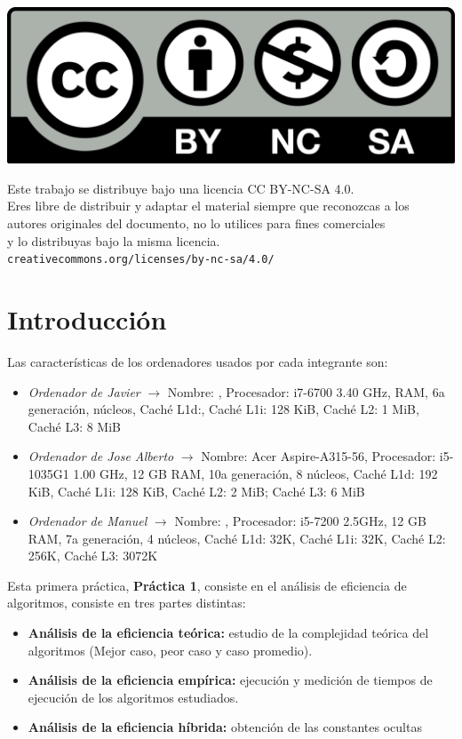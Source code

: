 \documentclass[10pt,a4paper]{article}
\begin{document}
\parbox[t]{\textwidth}{
  \includegraphics[scale=0.05]{by-nc-sa.png}\\[4pt]
  \raggedright %
  \sffamily\large
  {\Large Este trabajo se distribuye bajo una licencia CC BY-NC-SA 4.0.}\\[4pt]
  Eres libre de distribuir y adaptar el material siempre que reconozcas a los\\
  autores originales del documento, no lo utilices para fines comerciales\\
  y lo distribuyas bajo la misma licencia.\\[4pt]
  \texttt{creativecommons.org/licenses/by-nc-sa/4.0/}
}

\newpage

\tableofcontents

\newpage
\section{Introducción}

Las características de los ordenadores usados por cada integrante son:
\begin{itemize}
	\item \textit{Ordenador de Javier} \(\longrightarrow\) Nombre: , Procesador: i7-6700 3.40 GHz, RAM, 6a generación, núcleos, Caché L1d:, Caché L1i: 128 KiB, Caché L2: 1 MiB, Caché L3: 8 MiB 
	\item \textit{Ordenador de Jose Alberto} \(\longrightarrow\) Nombre: Acer Aspire-A315-56, Procesador: i5-1035G1 1.00 GHz, 12 GB RAM, 10a generación, 8 núcleos, Caché L1d: 192 KiB, Caché L1i: 128 KiB, Caché L2: 2 MiB; Caché L3: 6 MiB
	\item \textit{Ordenador de Manuel} \(\longrightarrow\) Nombre: , Procesador: i5-7200 2.5GHz, 12 GB RAM, 7a generación, 4 núcleos, Caché L1d: 32K, Caché L1i: 32K, Caché L2: 256K, Caché L3: 3072K 
\end{itemize}

Esta primera práctica, \textbf{Práctica 1}, consiste en el análisis de eficiencia de algoritmos, consiste en tres partes distintas:
\begin{itemize}
	\item \textbf{Análisis de la eficiencia teórica:} estudio de la complejidad teórica del algoritmos (Mejor caso, peor caso y caso promedio).
	\item \textbf{Análisis de la eficiencia empírica:} ejecución y medición de tiempos de ejecución de los algoritmos estudiados.
	\item \textbf{Análisis de la eficiencia híbrida:} obtención de las constantes ocultas
\end{itemize}
\end{document}
